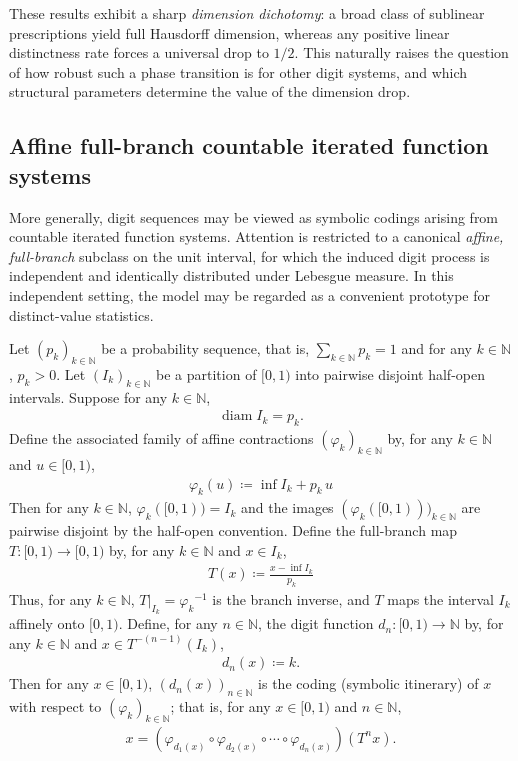 \documentclass[12pt,reqno]{amsart}
\theoremstyle{definition}
\theoremstyle{plain}
\begin{document}
These results exhibit a sharp \emph{dimension dichotomy}: a broad class of sublinear prescriptions yield full Hausdorff dimension, whereas any positive linear distinctness rate forces a universal drop to $1/2$. This naturally raises the question of how robust such a phase transition is for other digit systems, and which structural parameters determine the value of the dimension drop.

\subsection{Affine full-branch countable iterated function systems}

More generally, digit sequences may be viewed as symbolic codings arising from countable iterated function systems. Attention is restricted to a canonical \emph{affine, full-branch} subclass on the unit interval, for which the induced digit process is independent and identically distributed under Lebesgue measure. In this independent setting, the model may be regarded as a convenient prototype for distinct-value statistics.

Let $(p_k)_{k\in\mathbb N}$ be a probability sequence, that is, $\sum_{k\in\mathbb N}p_k=1$ and for any $k\in\mathbb{N}$, $p_k>0$. Let $(I_k)_{k\in\mathbb N}$ be a partition of $[0,1)$ into pairwise disjoint half-open intervals. Suppose for any $k\in\mathbb{N}$,
\begin{align*}
    \operatorname{diam}{I_k}=p_k.
\end{align*}
Define the associated family of affine contractions $(\varphi_k)_{k\in\mathbb N}$ by, for any $k\in\mathbb{N}$ and $u\in[0,1)$,
\begin{align*}
    \varphi_k(u)\coloneqq \inf I_k + p_k\,u
\end{align*}
Then for any $k\in\mathbb{N}$, $\varphi_k([0,1))=I_k$ and the images $(\varphi_k([0,1)))_{k\in\mathbb N}$ are pairwise disjoint by the half-open convention. Define the full-branch map $T:[0,1)\to[0,1)$ by, for any $k\in\mathbb{N}$ and $x\in I_k$,
\begin{align*}
    T(x)\coloneqq\frac{x-\inf I_k}{p_k}
\end{align*}
Thus, for any $k\in\mathbb{N}$, $T|_{I_k}={\varphi_k}^{-1}$ is the branch inverse, and $T$ maps the interval $I_k$ affinely onto $[0,1)$. Define, for any $n\in\mathbb{N}$, the digit function $d_n:[0,1)\to\mathbb{N}$ by, for any $k\in\mathbb{N}$ and $x\in T^{-(n-1)}(I_k)$,
\begin{align*}
    d_n(x)\coloneqq k.
\end{align*}
Then for any $x\in[0,1)$, $(d_n(x))_{n\in\mathbb N}$ is the coding (symbolic itinerary) of $x$ with respect to $(\varphi_k)_{k\in\mathbb N}$; that is, for any $x\in[0,1)$ and $n\in\mathbb{N}$, 
\begin{align*}
    x=\left(\varphi_{d_1(x)}\circ\varphi_{d_2(x)}\circ\cdots\circ\varphi_{d_n(x)}\right)\left(T^{n}x\right).
\end{align*}
\end{document}
